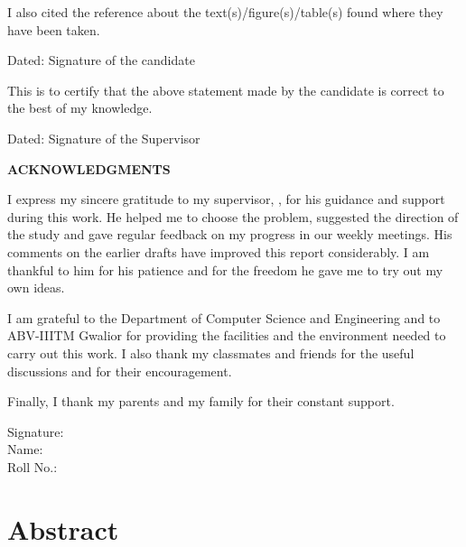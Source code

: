 \documentclass[12pt,a4paper,oneside]{report}
\begin{document}
\noindent I also cited the reference about the text(s)/figure(s)/table(s)
found where they have been taken.

\vspace{12mm}
\noindent Dated: \hfill Signature of the candidate\hspace{22mm}\null

\vspace{22mm}
\noindent This is to certify that the above statement made by the candidate is
correct to the best of my knowledge.

\vspace{12mm}
\noindent Dated: \hfill Signature of the Supervisor\hspace{22mm}\null
\endgroup
\clearpage

\vspace*{6mm}
\begin{center}{\Large\bfseries ACKNOWLEDGMENTS}\end{center}
\vspace{-2mm}
\noindent{\color{black!35}\rule{\linewidth}{0.5pt}}
\vspace{1mm}

I express my sincere gratitude to my supervisor, \supervisor, for his guidance
and support during this work. He helped me to choose the problem, suggested
the direction of the study and gave regular feedback on my progress in our
weekly meetings. His comments on the earlier drafts have improved this report
considerably. I am thankful to him for his patience and for the freedom he
gave me to try out my own ideas.

I am grateful to the Department of Computer Science and Engineering and to
ABV-IIITM Gwalior for providing the facilities and the environment needed to
carry out this work. I also thank my classmates and friends for the useful
discussions and for their encouragement.

Finally, I thank my parents and my family for their constant support.

\vspace{16mm}
\noindent Signature:\\
Name: \candidate\\
Roll No.: \rollno
\clearpage

\chapter*{Abstract}
\end{document}
